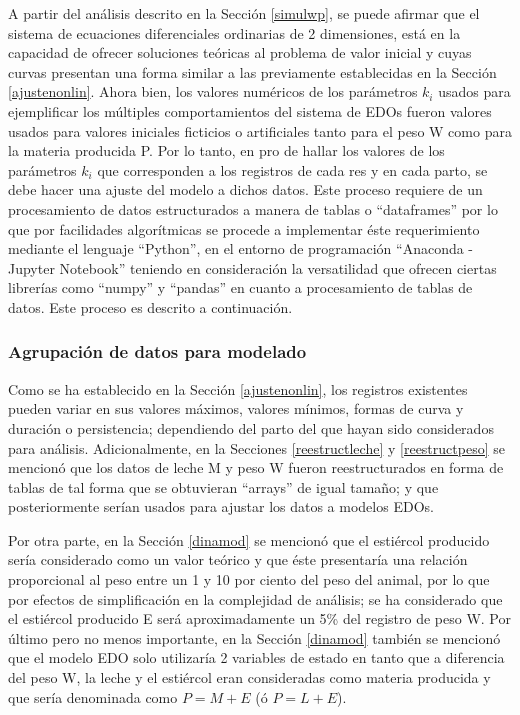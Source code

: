 A partir del análisis descrito en la Sección \ref{simulwp}, se puede afirmar que el sistema de ecuaciones diferenciales ordinarias de 2 dimensiones, está en la capacidad de ofrecer soluciones teóricas al problema de valor inicial y cuyas curvas presentan una forma similar a las previamente establecidas en la Sección \ref{ajustenonlin}.
Ahora bien, los valores numéricos de los parámetros $k_{i}$ usados para ejemplificar los múltiples comportamientos del sistema de EDOs fueron valores usados para valores iniciales ficticios o artificiales tanto para el peso W como para la materia producida P. Por lo tanto, en pro de hallar los valores de los parámetros $k_{i}$ que corresponden a los registros de cada res y en cada parto, se debe hacer una ajuste del modelo a dichos datos. Este proceso requiere de un procesamiento de datos estructurados a manera de tablas o ``dataframes'' por lo que por facilidades algorítmicas se procede a implementar éste requerimiento mediante el lenguaje ``Python'', en el entorno de programación ``Anaconda - Jupyter Notebook'' teniendo en consideración la versatilidad que ofrecen ciertas librerías como ``numpy'' y ``pandas'' en cuanto a procesamiento de tablas de datos. Este proceso es descrito a continuación.

\subsubsection{Agrupación de datos para modelado}

Como se ha establecido en la Sección \ref{ajustenonlin}, los registros existentes pueden variar en sus valores máximos, valores mínimos, formas de curva y duración o persistencia; dependiendo del parto del que hayan sido considerados para análisis. Adicionalmente, en la Secciones \ref{reestructleche} y \ref{reestructpeso} se mencionó que los datos de leche M y peso W fueron reestructurados en forma de tablas de tal forma que se obtuvieran ``arrays'' de igual tamaño; y que posteriormente serían usados para ajustar los datos a modelos EDOs.

Por otra parte, en la Sección \ref{dinamod} se mencionó que el estiércol producido sería considerado como un valor teórico y que éste presentaría una relación proporcional al peso entre un 1 y 10 por ciento del peso del animal, por lo que por efectos de simplificación en la complejidad de análisis; se ha considerado que el estiércol producido E será aproximadamente un 5\% del registro de peso W. Por último pero no menos importante, en la Sección \ref{dinamod} también se mencionó que el modelo EDO solo utilizaría 2 variables de estado en tanto que a diferencia del peso W, la leche y el estiércol eran consideradas como materia producida y que sería denominada como $P=M+E$ (ó $P=L+E$).


